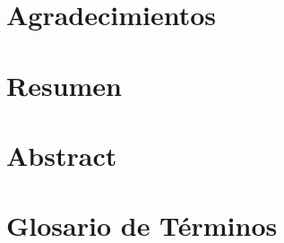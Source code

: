 \documentclass[12pt, oneside]{report}
\begin{document}








\chapter*{Agradecimientos}


\chapter*{Resumen}


\chapter*{Abstract}


\tableofcontents
\cleardoublepage
\listoftables
\cleardoublepage
\listoffigures
\cleardoublepage

\chapter*{Glosario de Términos}

\cleardoublepage
\end{document}
